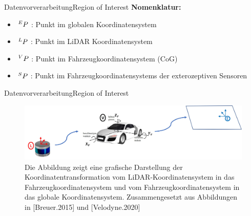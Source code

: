 \documentclass[169, handout	]{THIbeamer} %
\begin{document}
\begin{frame}{Datenvorverarbeitung}{Region of Interest}
	\textbf{Nomenklatur:} 
	\begin{itemize}
		\item $\hspace*{0.2em}^E\vspace*{-0.2em}P$ : Punkt im globalen Koordinatensystem
		\item $\hspace*{0.2em}^L\vspace*{-0.2em}P$ : Punkt im LiDAR Koordinatensystem
		\item $\hspace*{0.2em}^V\vspace*{-0.2em}P$ : Punkt im Fahrzeugkoordinatensystem (CoG)
		\item $\hspace*{0.2em}^{S}\vspace*{-0.2em}P$ : Punkt im Fahrzeugkoordinatensystems der exterozeptiven Sensoren
	\end{itemize}
\end{frame}
\begin{frame}{Datenvorverarbeitung}{Region of Interest}
	\begin{figure}
		\includegraphics[scale=0.5]{required/Szenarioanwendung Koordinatentransformation.jpg}
		\caption{Die Abbildung zeigt eine grafische Darstellung der Koordinatentransformation vom LiDAR-Koordinatensystem in das Fahrzeugkoordinatensystem und vom Fahrzeugkoordinatensystem in das globale Koordinatensystem. Zusammengesetzt aus Abbildungen in [Breuer.2015] und [Velodyne.2020]}
		\label{Globales Koordinatensystem}
	\end{figure}
	\footnotesize
	
	
\end{frame}
\end{document}
